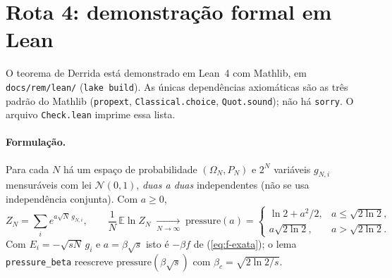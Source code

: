 \documentclass[11pt,a4paper]{article}
\newcommand{\E}{\mathbb{E}}
\begin{document}
\section{Rota 4: demonstração formal em Lean}
\label{sec:lean}

O teorema de Derrida está demonstrado em Lean~4 com Mathlib, em \texttt{docs/rem/lean/}
(\texttt{lake build}). As únicas dependências axiomáticas são as três padrão do Mathlib
(\texttt{propext}, \texttt{Classical.choice}, \texttt{Quot.sound}); não há \texttt{sorry}.
O arquivo \texttt{Check.lean} imprime essa lista.

\paragraph{Formulação.} Para cada $N$ há um espaço de probabilidade $(\Omega_N,P_N)$ e $2^N$ variáveis
$g_{N,i}$ mensuráveis com lei $\mathcal N(0,1)$, \emph{duas a duas} independentes (não se usa
independência conjunta). Com $a\ge0$,
\[
  Z_N=\sum_{i}e^{a\sqrt N\,g_{N,i}},\qquad
  \frac1N\,\E\ln Z_N\;\xrightarrow[N\to\infty]{}\;
  \mathrm{pressure}(a)=\begin{cases}\ln2+a^2/2,&a\le\sqrt{2\ln2},\\ a\sqrt{2\ln2},&a>\sqrt{2\ln2}.\end{cases}
\]
Com $E_i=-\sqrt{sN}\,g_i$ e $a=\beta\sqrt s$ isto é $-\beta f$ de (\ref{eq:f-exata}); o lema
\texttt{pressure\_beta} reescreve $\mathrm{pressure}(\beta\sqrt s)$ com $\beta_c=\sqrt{2\ln2/s}$.
\end{document}
